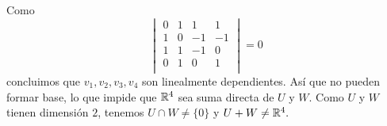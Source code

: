 \documentclass[12pt]{article}
\begin{document}
\begin{ejercicio}[2.5 puntos]
\begin{enumerate}[label=(\alph*)]
    Como
    \begin{equation*}
        \begin{vmatrix}
            0 & 1 & 1 & 1 \\
            1 & 0 & -1 & -1 \\
            1 & 1 & -1 & 0 \\
            0 & 1 & 0 & 1 \\
        \end{vmatrix} = 0
    \end{equation*}
    concluimos que $v_1, v_2, v_3, v_4$ son linealmente dependientes. Así que no pueden formar base, lo que impide que ${\mathbb{R}}^4$ sea suma directa de $U$ y $W$. Como $U$ y $W$ tienen dimensión $2$, tenemos $U \cap W \neq \{0\}$ y $U + W \neq {\mathbb{R}}^4.$
    \end{enumerate}
    \end{ejercicio}
    
\end{document}
